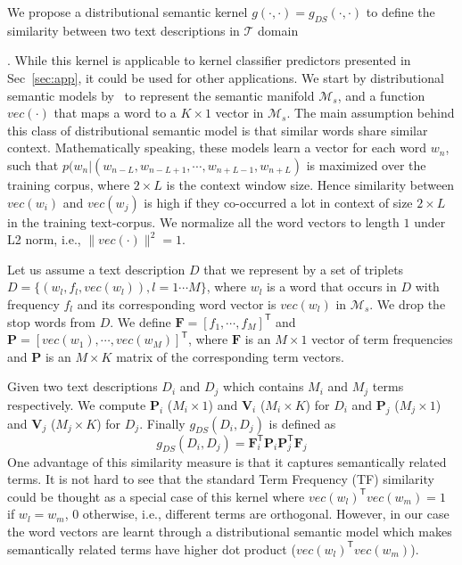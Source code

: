 
We propose a distributional semantic kernel $g(\cdot, \cdot) = g_{DS}(\cdot, \cdot)$  to define the similarity between two text descriptions in $\mathcal{T}$ domain. While this kernel is applicable to  kernel classifier predictors  presented in Sec~\ref{sec:app}, it could be used for other applications. We start by  distributional semantic models by~\cite{mikolov2013distributed,mikolov2013efficient} to represent the semantic manifold $\mathcal{M}_s$, and a function $vec(\cdot)$ that maps a word to a $K\times 1$ vector in $\mathcal{M}_s$. The main assumption behind this class of distributional semantic model  is that similar words share similar context. Mathematically speaking, these models  learn a vector for each word $w_n$, such  that $p(w_n|(w_{n-L}, w_{n-L+1}, \cdots,  w_{n+L-1},w_{n+L})$ is maximized over the training corpus, where $2\times L$ is the context window size. Hence similarity between $vec(w_i)$ and $vec(w_j)$ is high if they co-occurred a lot in context of size $2\times L$ in the training text-corpus. We normalize all the word vectors to length $1$ under L2 norm, i.e., $\| vec(\cdot) \|^2=1$. 

Let us assume a  text description ${D}$ that we represent by a set of triplets ${D} = \{(w_l,f_l, vec(w_l)), l=1\cdots M\}$, where $w_l$ is a word that occurs in ${D}$ with frequency $f_l$ and its corresponding word vector is $vec(w_l)$ in $\mathcal{M}_s$. We drop the stop words from ${D}$. We define  $\textbf{F} = [f_1, \cdots, f_M]^\textsf{T}$ and $\textbf{P} = [vec(w_1), \cdots, vec(w_M)]^\textsf{T}$, where $\textbf{F}$ is an $M\times1$  vector of term frequencies and $\textbf{P}$ is an $M \times K$ matrix of the corresponding term vectors. 

Given two text descriptions ${D}_i$ and ${D}_j$ which contains $M_i$ and $M_j$ terms respectively. We compute $\textbf{P}_i$ ($M_i \times 1$) and $\textbf{V}_i$ ($M_i \times K$) for  ${D}_i$  and $\textbf{P}_j$ ($M_j \times 1$) and $\textbf{V}_j$ ($M_j \times K$) for  ${D}_j$. Finally  $g_{DS}({D}_i, {D}_j)$ is defined as 
\begin{equation}
g_{DS}({D}_i, {D}_j) = \textbf{F}_i^\textsf{T} \textbf{P}_i \textbf{P}_j^\textsf{T}  \textbf{F}_j
\end{equation}
One advantage of this similarity measure is that it captures semantically related terms. It is not hard to see that the standard Term Frequency (TF) similarity could be thought as a special case of this kernel where $vec(w_l)^\mathsf{T} vec(w_m)=1$ if $w_l=w_m$, 0 otherwise, i.e., different terms are orthogonal. However, in our case the word vectors are learnt through a distributional semantic model which makes semantically related terms have higher dot product ($vec(w_l)^\mathsf{T} vec(w_m)$).   

